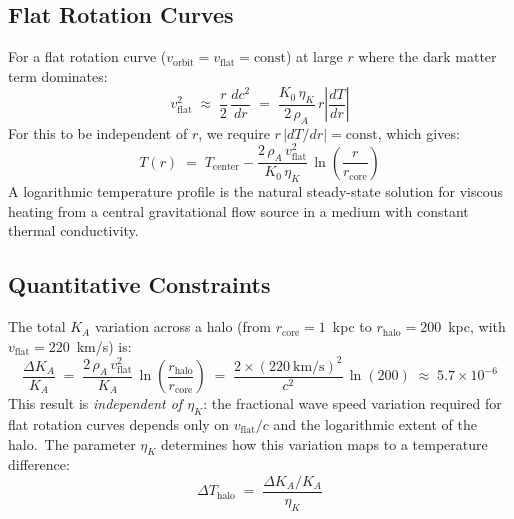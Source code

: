 \documentclass[12pt,letterpaper]{article}
\newcommand{\rhoa}{\rho_{\!A}}
\newcommand{\Ka}{K_{\!A}}
\newcommand{\etaK}{\eta_{\!K}}
\begin{document}
\subsection{Flat Rotation Curves}

For a flat rotation curve ($v_{\mathrm{orbit}} = v_{\mathrm{flat}} =
\mathrm{const}$) at large $r$ where the dark matter term dominates:
%
\begin{equation}
  v_{\mathrm{flat}}^2 \;\approx\; \frac{r}{2}\,\frac{dc^2}{dr}
    \;=\; \frac{K_0\,\etaK}{2\,\rhoa}\,r\left|
    \frac{dT}{dr}\right|
  \label{eq:flat-rotation}
\end{equation}
%
For this to be independent of $r$, we require $r\,|dT/dr| = \mathrm{const}$,
which gives:
%
\begin{equation}
  T(r) \;=\; T_{\mathrm{center}} - \frac{2\,\rhoa\,v_{\mathrm{flat}}^2}
    {K_0\,\etaK}\,\ln\!\left(\frac{r}{r_{\mathrm{core}}}\right)
  \label{eq:T-profile}
\end{equation}
%
A logarithmic temperature profile is the natural steady-state solution for
viscous heating from a central gravitational flow source in a medium with
constant thermal conductivity.


\subsection{Quantitative Constraints}

The total $\Ka$ variation across a halo (from $r_{\mathrm{core}} = 1$~kpc
to $r_{\mathrm{halo}} = 200$~kpc, with $v_{\mathrm{flat}} = 220$~km/s) is:
%
\begin{equation}
  \frac{\Delta\Ka}{\Ka} \;=\; \frac{2\,\rhoa\,v_{\mathrm{flat}}^2}{\Ka}
    \,\ln\!\left(\frac{r_{\mathrm{halo}}}{r_{\mathrm{core}}}\right)
  \;=\; \frac{2 \times (220~\text{km/s})^2}{c^2}\,\ln(200)
  \;\approx\; 5.7 \times 10^{-6}
  \label{eq:DKA-halo}
\end{equation}
%
This result is \emph{independent of $\etaK$}: the fractional wave speed
variation required for flat rotation curves depends only on
$v_{\mathrm{flat}}/c$ and the logarithmic extent of the halo.\ The parameter
$\etaK$ determines how this variation maps to a temperature difference:
%
\begin{equation}
  \Delta T_{\mathrm{halo}} \;=\; \frac{\Delta\Ka/\Ka}{\etaK}
  \label{eq:DT-halo}
\end{equation}
\end{document}
